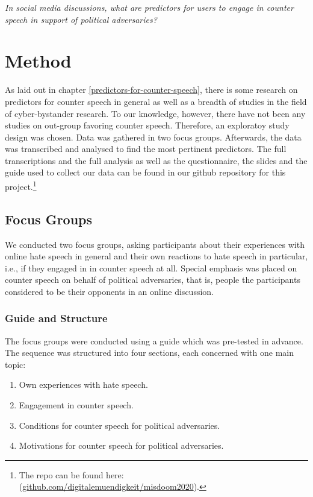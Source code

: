 \documentclass[runningheads]{llncs}
\providecommand{\tightlist}{%
  \setlength{\itemsep}{0pt}\setlength{\parskip}{0pt}}
\begin{document}
\emph{In social media discussions, what are predictors for users to engage in counter speech in support of political adversaries?}

\hypertarget{method}{%
\section{Method}\label{method}}

As laid out in chapter \ref{predictors-for-counter-speech}, there is some research on predictors for counter speech in general as well as a breadth of studies in the field of cyber-bystander research. To our knowledge, however, there have not been any studies on out-group favoring counter speech. Therefore, an exploratoy study design was chosen. Data was gathered in two focus groups. Afterwards, the data was transcribed and analysed to find the most pertinent predictors. The full transcriptions and the full analysis as well as the questionnaire, the slides and the guide used to collect our data can be found in our github repository for this project.\footnote{The repo can be found here: (\href{http://github.com/digitalemuendigkeit/misdoom2020}{github.com/digitalemuendigkeit/misdoom2020}).}

\hypertarget{focus-groups}{%
\subsection{Focus Groups}\label{focus-groups}}

We conducted two focus groups, asking participants about their experiences with online hate speech in general and their own reactions to hate speech in particular, i.e., if they engaged in in counter speech at all. Special emphasis was placed on counter speech on behalf of political adversaries, that is, people the participants considered to be their opponents in an online discussion.

\hypertarget{guide-and-structure}{%
\subsubsection{Guide and Structure}\label{guide-and-structure}}

The focus groups were conducted using a guide which was pre-tested in advance. The sequence was structured into four sections, each concerned with one main topic:

\begin{enumerate}
\def\labelenumi{\arabic{enumi}.}
\tightlist
\item
  Own experiences with hate speech.
\item
  Engagement in counter speech.
\item
  Conditions for counter speech for political adversaries.
\item
  Motivations for counter speech for political adversaries.
\end{enumerate}
\end{document}
